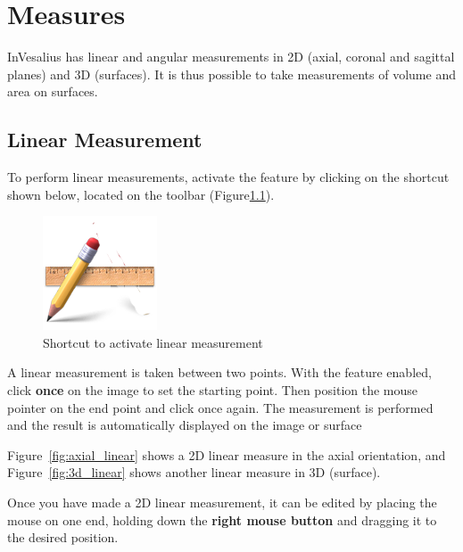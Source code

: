 \chapter{Measures}

InVesalius has linear and angular measurements in 2D (axial, coronal and sagittal planes) and 3D (surfaces). It is thus possible to take measurements of volume and area on surfaces.

\section{Linear Measurement}

To perform linear measurements, activate the feature by clicking on the shortcut shown below, located on the toolbar (Figure\ref{fig:measure_line_original}).

\begin{figure}[!htb]
\centering
\includegraphics[scale=0.2]{../user_guide_figures/icons/measure_line_original.png}
\caption{Shortcut to activate linear measurement}
\label{fig:measure_line_original}
\end{figure}

A linear measurement is taken between two points. With the feature enabled, click \textbf{once} on the image to set the starting point. Then position the mouse pointer on the end point and click once again. The measurement is performed and the result is automatically displayed on the image or surface

Figure~\ref{fig:axial_linear} shows a 2D linear measure in the axial orientation, and Figure~\ref{fig:3d_linear} shows another linear measure in 3D (surface).

Once you have made a 2D linear measurement, it can be edited by placing the mouse on one end, holding down the \textbf{right mouse button} and dragging it to the desired position.

